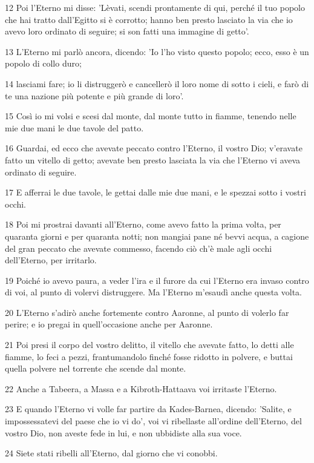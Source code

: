 \par 12 Poi l'Eterno mi disse: 'Lèvati, scendi prontamente di qui, perché il tuo popolo che hai tratto dall'Egitto si è corrotto; hanno ben presto lasciato la via che io avevo loro ordinato di seguire; si son fatti una immagine di getto'.
\par 13 L'Eterno mi parlò ancora, dicendo: 'Io l'ho visto questo popolo; ecco, esso è un popolo di collo duro;
\par 14 lasciami fare; io li distruggerò e cancellerò il loro nome di sotto i cieli, e farò di te una nazione più potente e più grande di loro'.
\par 15 Così io mi volsi e scesi dal monte, dal monte tutto in fiamme, tenendo nelle mie due mani le due tavole del patto.
\par 16 Guardai, ed ecco che avevate peccato contro l'Eterno, il vostro Dio; v'eravate fatto un vitello di getto; avevate ben presto lasciata la via che l'Eterno vi aveva ordinato di seguire.
\par 17 E afferrai le due tavole, le gettai dalle mie due mani, e le spezzai sotto i vostri occhi.
\par 18 Poi mi prostrai davanti all'Eterno, come avevo fatto la prima volta, per quaranta giorni e per quaranta notti; non mangiai pane né bevvi acqua, a cagione del gran peccato che avevate commesso, facendo ciò ch'è male agli occhi dell'Eterno, per irritarlo.
\par 19 Poiché io avevo paura, a veder l'ira e il furore da cui l'Eterno era invaso contro di voi, al punto di volervi distruggere. Ma l'Eterno m'esaudì anche questa volta.
\par 20 L'Eterno s'adirò anche fortemente contro Aaronne, al punto di volerlo far perire; e io pregai in quell'occasione anche per Aaronne.
\par 21 Poi presi il corpo del vostro delitto, il vitello che avevate fatto, lo detti alle fiamme, lo feci a pezzi, frantumandolo finché fosse ridotto in polvere, e buttai quella polvere nel torrente che scende dal monte.
\par 22 Anche a Tabeera, a Massa e a Kibroth-Hattaava voi irritaste l'Eterno.
\par 23 E quando l'Eterno vi volle far partire da Kades-Barnea, dicendo: 'Salite, e impossessatevi del paese che io vi do', voi vi ribellaste all'ordine dell'Eterno, del vostro Dio, non aveste fede in lui, e non ubbidiste alla sua voce.
\par 24 Siete stati ribelli all'Eterno, dal giorno che vi conobbi.
